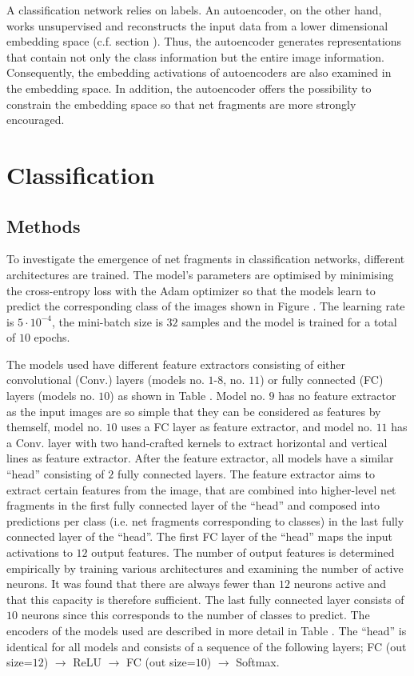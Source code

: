 A classification network relies on labels.
An autoencoder, on the other hand, works unsupervised and reconstructs the input data from a lower dimensional embedding space (c.f. section ).
Thus, the autoencoder generates representations that contain not only the class information but the entire image information.
Consequently, the embedding activations of autoencoders are also examined in the embedding space.
In addition, the autoencoder offers the possibility to constrain the embedding space so that net fragments are more strongly encouraged.



\section{Classification}

\subsection{Methods}
To investigate the emergence of net fragments in classification networks, different architectures are trained.
The model's parameters are optimised by minimising the cross-entropy loss with the Adam optimizer  so that the models learn to predict the corresponding class of the images shown in Figure .
The learning rate is $5 \cdot 10^{-4}$, the mini-batch size is $32$ samples and the model is trained for a total of $10$ epochs.

The models used have different feature extractors consisting of either convolutional (Conv.) layers (models no. $1$-$8$, no. $11$) or fully connected (FC) layers (models no. $10$) as shown in Table .
Model no. $9$ has no feature extractor as the input images are so simple that they can be considered as features by themself, model no. $10$ uses a FC layer as feature extractor, and model no. $11$ has a Conv. layer with two hand-crafted kernels to extract horizontal and vertical lines as feature extractor.
After the feature extractor, all models have a similar ``head'' consisting of $2$ fully connected layers.
The feature extractor aims to extract certain features from the image, that are combined into higher-level net fragments in the first fully connected layer of the ``head'' and composed into predictions per class (i.e. net fragments corresponding to classes) in the last fully connected layer of the ``head''.
The first FC layer of the ``head'' maps the input activations to $12$ output features.
The number of output features is determined empirically by training various architectures and examining the number of active neurons.
It was found that there are always fewer than $12$ neurons active and that this capacity is therefore sufficient.
The last fully connected layer consists of $10$ neurons since this corresponds to the number of classes to predict.
The encoders of the models used are described in more detail in Table .
The ``head'' is identical for all models and consists of a sequence of the following layers; FC (out size=$12$) $\rightarrow$ ReLU $\rightarrow$ FC (out size=$10$) $\rightarrow$ Softmax.

